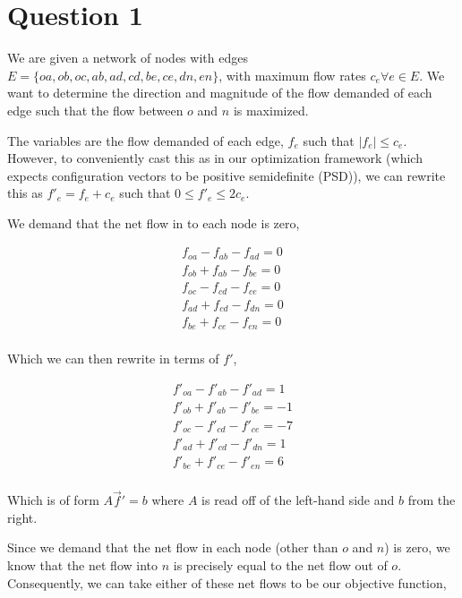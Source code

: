 \documentclass{article}
\begin{document}
\section{Question 1}

We are given a network of nodes with edges $E = \{ oa, ob, oc, ab, ad, cd,
be, ce, dn, en \}$, with maximum flow rates $c_e \forall e \in E$. We want
to determine the direction and magnitude of the flow demanded of each
edge such that the flow between $o$ and $n$ is maximized.

The variables are the flow demanded of each edge, $f_e$ such that
$|f_e| \le c_e$. However, to conveniently cast this as in our
optimization framework (which expects configuration vectors to be
positive semidefinite (PSD)), we can rewrite this as $f'_e = f_e + c_e$ such
that $0 \le f'_e \le 2 c_e$.

We demand that the net flow in to each node is zero,

\begin{align*}
  f_{oa} - f_{ab} - f_{ad} = 0 \tag{node $a$} \\
  f_{ob} + f_{ab} - f_{be} = 0 \tag{node $b$} \\
  f_{oc} - f_{cd} - f_{ce} = 0 \tag{node $c$} \\
  f_{ad} + f_{cd} - f_{dn} = 0 \tag{node $d$} \\
  f_{be} + f_{ce} - f_{en} = 0 \tag{node $e$} \\
\end{align*}

Which we can then rewrite in terms of $f'$,

\begin{align*}
  f'_{oa} - f'_{ab} - f'_{ad} = 1  \tag{node $a$} \\
  f'_{ob} + f'_{ab} - f'_{be} = -1 \tag{node $b$} \\
  f'_{oc} - f'_{cd} - f'_{ce} = -7 \tag{node $c$} \\
  f'_{ad} + f'_{cd} - f'_{dn} = 1  \tag{node $d$} \\
  f'_{be} + f'_{ce} - f'_{en} = 6  \tag{node $e$} \\
\end{align*}

Which is of form $A \vec f' = b$ where $A$ is read off of the
left-hand side and $b$ from the right.

Since we demand that the net flow in each node (other than $o$ and
$n$) is zero, we know that the net flow into $n$ is precisely equal to
the net flow out of $o$. Consequently, we can take either of these net
flows to be our objective function,
\end{document}
